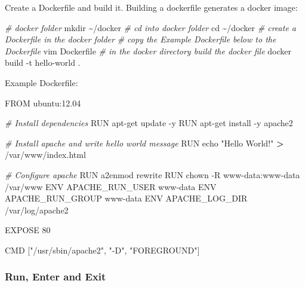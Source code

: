 \documentclass[
]{book}
\newenvironment{Shaded}{\begin{snugshade}}{\end{snugshade}}
\newcommand{\BuiltInTok}[1]{#1}
\newcommand{\CommentTok}[1]{\textcolor[rgb]{0.56,0.35,0.01}{\textit{#1}}}
\newcommand{\ExtensionTok}[1]{#1}
\newcommand{\FunctionTok}[1]{\textcolor[rgb]{0.00,0.00,0.00}{#1}}
\newcommand{\NormalTok}[1]{#1}
\newcommand{\OperatorTok}[1]{\textcolor[rgb]{0.81,0.36,0.00}{\textbf{#1}}}
\newcommand{\StringTok}[1]{\textcolor[rgb]{0.31,0.60,0.02}{#1}}
\begin{document}
Create a Dockerfile and build it. Building a dockerfile generates a docker image:

\begin{Shaded}
\begin{Highlighting}[]
\CommentTok{\# docker folder}
\FunctionTok{mkdir}\NormalTok{ \textasciitilde{}/docker}
\CommentTok{\# cd into docker folder}
\BuiltInTok{cd}\NormalTok{ \textasciitilde{}/docker}
\CommentTok{\# create a Dockerfile in the docker folder}
\CommentTok{\# copy the Example Dockerfile below to the Dockerfile}
\ExtensionTok{vim}\NormalTok{ Dockerfile}
\CommentTok{\# in the docker directory build the docker file}
\ExtensionTok{docker}\NormalTok{ build {-}t hello{-}world .}
\end{Highlighting}
\end{Shaded}

Example Dockerfile:

\begin{Shaded}
\begin{Highlighting}[]
\ExtensionTok{FROM}\NormalTok{ ubuntu:12.04}

\CommentTok{\# Install dependencies}
\ExtensionTok{RUN}\NormalTok{ apt{-}get update {-}y}
\ExtensionTok{RUN}\NormalTok{ apt{-}get install {-}y apache2}

\CommentTok{\# Install apache and write hello world message}
\ExtensionTok{RUN}\NormalTok{ echo }\StringTok{"Hello World!"} \OperatorTok{\textgreater{}}\NormalTok{ /var/www/index.html}

\CommentTok{\# Configure apache}
\ExtensionTok{RUN}\NormalTok{ a2enmod rewrite}
\ExtensionTok{RUN}\NormalTok{ chown {-}R www{-}data:www{-}data /var/www}
\ExtensionTok{ENV}\NormalTok{ APACHE\_RUN\_USER www{-}data}
\ExtensionTok{ENV}\NormalTok{ APACHE\_RUN\_GROUP www{-}data}
\ExtensionTok{ENV}\NormalTok{ APACHE\_LOG\_DIR /var/log/apache2}

\ExtensionTok{EXPOSE}\NormalTok{ 80}

\ExtensionTok{CMD}\NormalTok{ [}\StringTok{"/usr/sbin/apache2"}\NormalTok{, }\StringTok{"{-}D"}\NormalTok{,  }\StringTok{"FOREGROUND"}\NormalTok{]}
\end{Highlighting}
\end{Shaded}

\hypertarget{run-enter-and-exit}{%
\subsubsection{Run, Enter and Exit}\label{run-enter-and-exit}}
\end{document}
